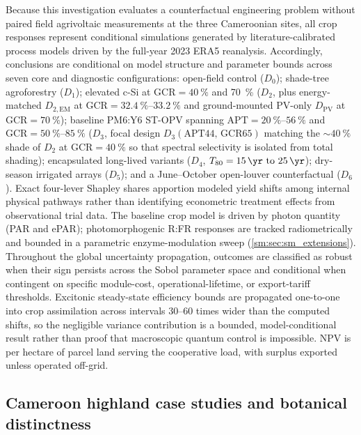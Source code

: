 \documentclass[preprint,12pt,a4paper]{elsarticle}
\begin{document}
Because this investigation evaluates a counterfactual engineering problem without paired field agrivoltaic measurements at the three Cameroonian sites, all crop responses represent conditional simulations generated by literature-calibrated process models driven by the full-year 2023 ERA5 reanalysis. Accordingly, conclusions are conditional on model structure and parameter bounds across seven core and diagnostic configurations: open-field control ($D_0$); shade-tree agroforestry ($D_1$); elevated c-Si at $\mathrm{GCR}=\qty{40}{\percent}$ and \qty{70}{\percent} ($D_2$, plus energy-matched $D_{2,\mathrm{EM}}$ at $\mathrm{GCR}=\qtyrange{32.4}{33.2}{\percent}$ and ground-mounted PV-only $D_{\mathrm{PV}}$ at $\mathrm{GCR}=\qty{70}{\percent}$); baseline PM6:Y6 ST-OPV spanning $\mathrm{APT}=\qtyrange{20}{56}{\percent}$ and $\mathrm{GCR}=\qtyrange{50}{85}{\percent}$ ($D_3$, focal design $D_3(\mathrm{APT44,\,GCR65})$ matching the $\sim\qty{40}{\percent}$ shade of $D_2$ at $\mathrm{GCR}=\qty{40}{\percent}$ so that spectral selectivity is isolated from total shading); encapsulated long-lived variants ($D_4$, $T_{80}=\qtyrange{15}{25}{\yr}$); dry-season irrigated arrays ($D_5$); and a June--October open-louver counterfactual ($D_6$). Exact four-lever Shapley shares apportion modeled yield shifts among internal physical pathways rather than identifying econometric treatment effects from observational trial data. The baseline crop model is driven by photon quantity (PAR and ePAR); photomorphogenic R:FR responses are tracked radiometrically and bounded in a parametric enzyme-modulation sweep (\cref{sm:sec:sm_extensions}). Throughout the global uncertainty propagation, outcomes are classified as robust when their sign persists across the Sobol parameter space and conditional when contingent on specific module-cost, operational-lifetime, or export-tariff thresholds. Excitonic steady-state efficiency bounds are propagated one-to-one into crop assimilation across intervals \numrange{30}{60} times wider than the computed shifts, so the negligible variance contribution is a bounded, model-conditional result rather than proof that macroscopic quantum control is impossible. NPV is per hectare of parcel land serving the cooperative load, with surplus exported unless operated off-grid.

\subsection{Cameroon highland case studies and botanical distinctness}
\label{sec:sites}
\end{document}
